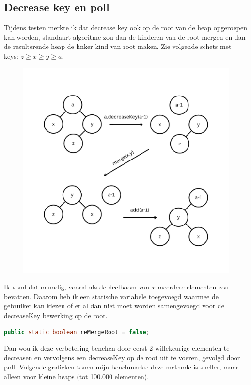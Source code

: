 \documentclass[12pt,a4paper,fleqn]{report}
\begin{document}
	\subsection{Decrease key en poll}

	Tijdens testen merkte ik dat decrease key ook op de root van de heap opgeroepen kan
	worden, standaart algoritme zou dan de kinderen van de root mergen en dan de resulterende heap de linker kind van root maken. Zie volgende schets met keys: $z \ge x \ge y \ge a$.

	\begin{figure}[H]
		\centering
		\includegraphics[height=0.45\textheight]{assets/skew_decrease_key_poll.pdf}
	\end{figure}
\pagebreak

	Ik vond dat onnodig, vooral als de deelboom van $x$ meerdere elementen zou bevatten.
	Daarom heb ik een statische variabele toegevoegd waarmee de gebruiker kan kiezen of er al
	dan niet moet worden samengevoegd voor de \textsf{decreaseKey} bewerking op de root.

	\begin{lstlisting}[language=Java]
	public static boolean reMergeRoot = false;
\end{lstlisting}

	Dan wou ik deze verbetering benchen door eerst 2 willekeurige elementen te decreasen en
	vervolgens een \textsf{decreaseKey} op de root uit te voeren, gevolgd door \textsf{poll}.
	Volgende grafieken tonen mijn benchmarks: deze methode is sneller, maar alleen voor
	kleine heaps (tot 100.000 elementen).
\end{document}
